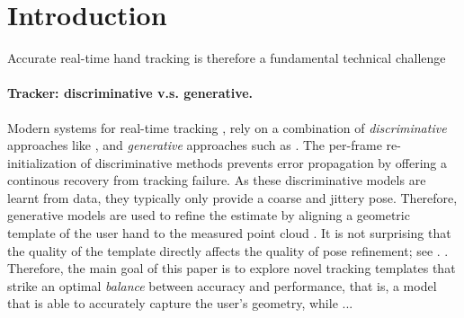 % 
% 
% 
% 
\section{Introduction}

Accurate real-time hand tracking is therefore a fundamental technical challenge 


\paragraph{Tracker: discriminative v.s. generative.}
Modern systems for real-time tracking \cite{sridhar2015fast,sharp2015accurate},  rely on a combination of \emph{discriminative} approaches like \cite{oberweger2015feedback}, and \emph{generative} approaches such as \cite{tagliasacchi2015robust}. The per-frame re-initialization of discriminative methods prevents error propagation by offering a continous recovery from tracking failure. As these discriminative models are learnt from data, they typically only provide a coarse and jittery pose. Therefore, generative models are used to refine the estimate by aligning a geometric template of the user hand to the measured point cloud . It is not surprising that the quality of the template directly affects the quality of pose refinement; see . 
.
% 
Therefore, the main goal of this paper is to explore novel tracking templates that strike an optimal \emph{balance} between accuracy and performance, that is, a model that is able to accurately capture the user's geometry, while ...

